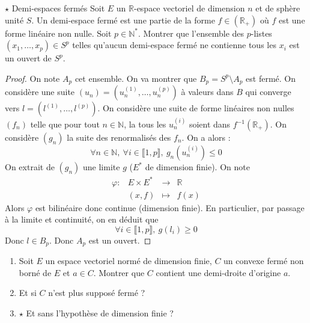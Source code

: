 \documentclass[french,a4paper]{article}
\newcommand{\N}{\mathbb{N}}
\newcommand{\R}{\mathbb{R}}
\newcommand{\st}{^*}
\newcommand{\inv}{^{-1}}
\theoremstyle{plain}
\theoremstyle{definition}
\theoremstyle{remark}
\begin{document}
\begin{ex}{$\star$ Demi-espaces fermés}
	Soit $E$ un $\R$-espace vectoriel de dimension $n$ et de sphère unité $S$. Un demi-espace fermé est une partie de la forme $f\in(\R_+)$ où $f$ est une forme linéaire non nulle. Soit $p\in\N\st$. Montrer que l'ensemble des $p$-listes $(x_1,\ldots,x_p)\in S^p$ telles qu'aucun demi-espace fermé ne contienne tous les $x_i$ est un ouvert de $S^p$.
\end{ex}
\begin{proof}
	On note $A_p$ cet ensemble. On va montrer que $B_p=S^p\setminus A_p$ est fermé. On considère une suite $(u_n)=(u_n^{(1)},\ldots,u_n^{(p)})$ à valeurs dans $B$ qui converge vers $l=(l^{(1)},\ldots,l^{(p)})$. On considère une suite de forme linéaires non nulles $(f_n)$ telle que pour tout $n\in\N$, la tous les $u_n^{(i)}$ soient dans $f\inv(\R_+)$. On considère $(g_n)$ la suite des renormalisés des $f_n$. On a alors : $$\forall n\in\N,\ \forall i\in\llbracket1,p\rrbracket,\ g_n(u_n^{(i)})\leqslant 0$$ On extrait de $(g_n)$ une limite $g$ ($E\st$ de dimension finie). On note $$\begin{array}{lrcl}
		\varphi:&E\times E\st&\longrightarrow&\R \\
		&(x,f)&\longmapsto&f(x)
	\end{array}$$ Alors $\varphi$ est bilinéaire donc continue (dimension finie). En particulier, par passage à la limite et continuité, on en déduit que $$\forall i\in\llbracket1,p\rrbracket,\ g(l_i)\geqslant 0$$ Donc $l\in B_p$. Donc $A_p$ est un ouvert.
\end{proof}

\begin{ex}{}
	\begin{enumerate}
		\item Soit $E$ un espace vectoriel normé de dimension finie, $C$ un convexe fermé non borné de $E$ et $a\in C$. Montrer que $C$ contient une demi-droite d'origine $a$.
		\item Et si $C$ n'est plus supposé fermé ?
		\item $\star$ Et sans l'hypothèse de dimension finie ?
	\end{enumerate}
\end{ex}
\end{document}
